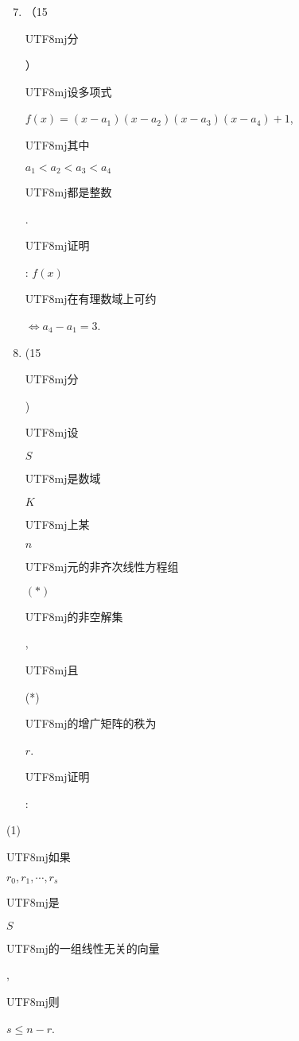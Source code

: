 \documentclass[10pt]{article}
\begin{document}
\begin{enumerate}
  \setcounter{enumi}{6}
  \item （15 \begin{CJK}{UTF8}{mj}分\end{CJK}） \begin{CJK}{UTF8}{mj}设多项式\end{CJK} $f(x)=\left(x-a_{1}\right)\left(x-a_{2}\right)\left(x-a_{3}\right)\left(x-a_{4}\right)+1$, \begin{CJK}{UTF8}{mj}其中\end{CJK} $a_{1}<a_{2}<a_{3}<a_{4}$ \begin{CJK}{UTF8}{mj}都是整数\end{CJK}. \begin{CJK}{UTF8}{mj}证明\end{CJK}: $f(x)$ \begin{CJK}{UTF8}{mj}在有理数域上可约\end{CJK} $\Longleftrightarrow a_{4}-a_{1}=3$.

  \item (15 \begin{CJK}{UTF8}{mj}分\end{CJK}) \begin{CJK}{UTF8}{mj}设\end{CJK} $S$ \begin{CJK}{UTF8}{mj}是数域\end{CJK} $K$ \begin{CJK}{UTF8}{mj}上某\end{CJK} $n$ \begin{CJK}{UTF8}{mj}元的非齐次线性方程组\end{CJK} $(*)$ \begin{CJK}{UTF8}{mj}的非空解集\end{CJK}, \begin{CJK}{UTF8}{mj}且\end{CJK} (*) \begin{CJK}{UTF8}{mj}的增广矩阵的秩为\end{CJK} $r$. \begin{CJK}{UTF8}{mj}证明\end{CJK}:

\end{enumerate}
(1) \begin{CJK}{UTF8}{mj}如果\end{CJK} $r_{0}, r_{1}, \cdots, r_{s}$ \begin{CJK}{UTF8}{mj}是\end{CJK} $S$ \begin{CJK}{UTF8}{mj}的一组线性无关的向量\end{CJK}, \begin{CJK}{UTF8}{mj}则\end{CJK} $s \leq n-r$.
\end{document}
